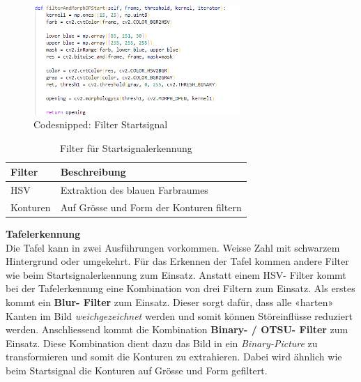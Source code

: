 \documentclass[../../main.tex]{subfiles}
\begin{document}
\vspace{0.5cm}

\begin{figure}[H] %
  \centering
  \includegraphics[width=0.7\textwidth]{codesnipped-filterStart.png}
  \caption{Codesnipped: Filter Startsignal}
  \label{fig:codesnipped_startfilter}
\end{figure}

\vspace{1cm}

\begin{table}[H] %
  \begin{flushleft}
      \begin{tabular}{ | p{3cm} | p{10.5cm} |}
          \hline
          \textbf{Filter}  & \textbf{Beschreibung} \\\hline
          HSV          & Extraktion des blauen Farbraumes \\\hline
          Konturen     & Auf Grösse und Form der Konturen filtern\\\hline
      \end{tabular}
  \end{flushleft}
  \caption{Filter für Startsignalerkennung}
  \label{tab:filter_startsignal}
\end{table}

\newpage

\textbf{Tafelerkennung}\\
Die Tafel kann in zwei Ausführungen vorkommen. Weisse Zahl mit schwarzem Hintergrund oder umgekehrt. Für das Erkennen der Tafel kommen andere Filter wie beim Startsignalerkennung zum Einsatz. Anstatt einem HSV- Filter kommt bei der Tafelerkennung eine Kombination von drei Filtern zum Einsatz. Als erstes kommt ein \textbf{Blur- Filter} zum Einsatz. Dieser sorgt dafür, dass alle «harten» Kanten im Bild \textit{weichgezeichnet} werden und somit können Störeinflüsse reduziert werden. Anschliessend kommt die Kombination \textbf{Binary- / OTSU- Filter} zum Einsatz. Diese Kombination dient dazu das Bild in ein \textit{Binary-Picture} zu transformieren und somit die Konturen zu extrahieren. Dabei wird ähnlich wie beim Startsignal die Konturen auf Grösse und Form gefiltert.
\end{document}
